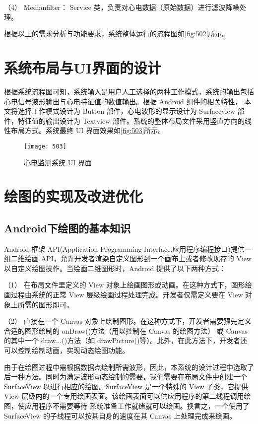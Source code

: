 （4）	Medianfilter： Service 类，负责对心电数据（原始数据）进行滤波降噪处理。 

根据以上的需求分析与功能要求，系统整体运行的流程图如\autoref{fig:502}所示。 

\section{系统布局与UI界面的设计}
根据系统流程图可知，系统输入是用户人工选择的两种工作模式，系统的输出包括心电信号波形输出与心电特征值的数值输出。根据 Android 组件的相关特性，
本文将选择工作模式设计为 Button 部件，心电波形的显示设计为 Surfaceview 部件，特征值的输出设计为 Textview 部件。系统的整体布局文件采用竖直方向的线性布局方式。系统最终
UI 界面效果如\autoref{fig:503}所示。 
\begin{figure}[htbp]
    \centering
    \texttt{[image: 503]}
    \caption{\label{fig:503} 心电监测系统 UI 界面}
\end{figure}

\section{绘图的实现及改进优化}
\subsection{Android下绘图的基本知识} 
Android 框架 API(Application Programming Interface,应用程序编程接口)提供一组二维绘画 API，允许开发者渲染自定义图形到一个画布上或者修改现存的 
View 以自定义绘图操作\cite{27}。当绘画二维图形时，Android 提供了以下两种方式： 

（1）	在布局文件里定义的 View 对象上绘画图形或动画。在这种方式下，图形绘画过程由系统的正常 View 层级绘画过程处理完成。开发者仅需定义要在 View 对象上所需的图形即可。 

（2）	直接在一个 Canvas 对象上绘制图形。在这种方式下，开发者需要预先定义合适的图形绘制的 onDraw()方法（用以控制在 Canvas 的绘图方法）
或 Canvas 的其中一个 draw...()方法（如 drawPicture()等）。此外，在此方法下，开发者还可以控制绘制动画，实现动态绘图功能。  

由于在绘图过程中需根据数据点绘制所需波形，因此，本系统的设计过程中选取了后一种方法。同时为满足波形动态绘制的需要，我们需要在布局文件中创建一个 SurfaceView 
以进行相应的绘图。SurfaceView 是一个特殊的 View 子类，它提供 View 层级内的一个专用绘画表面。该绘画表面可以供应用程序的第二线程调用绘图，使应用程序不需要等待
系统准备工作就绪就可以绘画。换言之，一个使用了 SurfaceView 的子线程可以按其自身的速度在其 Canvas 上处理完成来绘画。 

